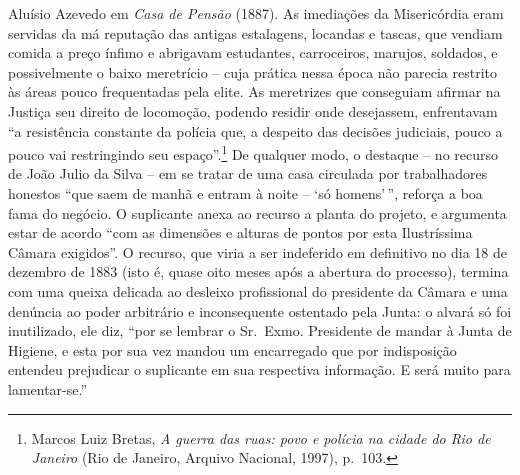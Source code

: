 Aluísio Azevedo em \emph{Casa de Pensão} (1887). As imediações da
Misericórdia eram servidas da má reputação das antigas estalagens,
locandas e tascas, que vendiam comida a preço ínfimo e abrigavam
estudantes, carroceiros, marujos, soldados, e possivelmente o baixo
meretrício -- cuja prática nessa época não parecia restrito às áreas
pouco frequentadas pela elite. As meretrizes que conseguiam afirmar na
Justiça seu direito de locomoção, podendo residir onde desejassem,
enfrentavam ``a resistência constante da polícia que, a despeito das
decisões judiciais, pouco a pouco vai restringindo seu
espaço''.\footnote{Marcos Luiz Bretas, \emph{A guerra das ruas: povo e
  polícia na cidade do Rio de Janeiro} (Rio de Janeiro, Arquivo
  Nacional, 1997), p.~103.} De qualquer modo, o destaque -- no recurso
de João Julio da Silva -- em se tratar de uma casa circulada por
trabalhadores honestos ``que saem de manhã e entram à noite -- `só
homens'\,'', reforça a boa fama do negócio. O suplicante anexa ao
recurso a planta do projeto, e argumenta estar de acordo ``com as
dimensões e alturas de pontos por esta Ilustríssima Câmara exigidos''. O
recurso, que viria a ser indeferido em definitivo no dia 18 de dezembro
de 1883 (isto é, quase oito meses após a abertura do processo), termina
com uma queixa delicada ao desleixo profissional do presidente da Câmara
e uma denúncia ao poder arbitrário e inconsequente ostentado pela Junta:
o alvará só foi inutilizado, ele diz, ``por se lembrar o Sr.~Exmo.
Presidente de mandar à Junta de Higiene, e esta por sua vez mandou um
encarregado que por indisposição entendeu prejudicar o suplicante em sua
respectiva informação. E será muito para lamentar-se.''

